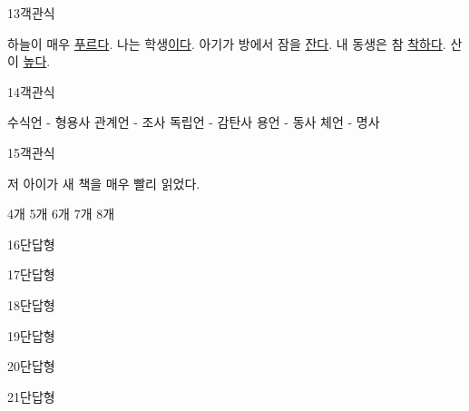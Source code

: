 \documentclass[fs9,seriesRus]{korfarm-base}
\begin{document}
\begin{kfQBlock}{13}{객관식}
\begin{kfChoices}
\kfChoice 하늘이 매우 \uline{푸르다}.
\kfChoice 나는 학생\uline{이다}.
\kfChoice 아기가 방에서 잠을 \uline{잔다}.
\kfChoice 내 동생은 참 \uline{착하다}.
\kfChoice 산이 \uline{높다}.
\end{kfChoices}
\end{kfQBlock}
\begin{kfQBlock}{14}{객관식}
\begin{kfChoices}
\kfChoice 수식언 - 형용사
\kfChoice 관계언 - 조사
\kfChoice 독립언 - 감탄사
\kfChoice 용언 - 동사
\kfChoice 체언 - 명사
\end{kfChoices}
\end{kfQBlock}
\begin{kfQBlock}{15}{객관식}
\begin{kfEvidence}저 아이가 새 책을 매우 빨리 읽었다.\end{kfEvidence}
\begin{kfChoices}
\kfChoice 4개
\kfChoice 5개
\kfChoice 6개
\kfChoice 7개
\kfChoice 8개
\end{kfChoices}
\end{kfQBlock}
\begin{kfQBlock}{16}{단답형}
\end{kfQBlock}
\begin{kfQBlock}{17}{단답형}
\end{kfQBlock}
\begin{kfQBlock}{18}{단답형}
\end{kfQBlock}
\begin{kfQBlock}{19}{단답형}
\end{kfQBlock}
\begin{kfQBlock}{20}{단답형}
\end{kfQBlock}
\begin{kfQBlock}{21}{단답형}
\end{kfQBlock}
\end{document}
